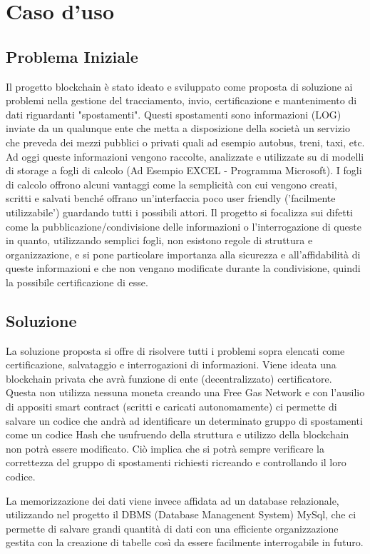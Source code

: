 \documentclass[11pt,a4paper,titlepage]{report}
\begin{document}
\chapter{Caso d'uso}

\section{Problema Iniziale}
Il progetto blockchain è stato ideato e sviluppato come proposta di soluzione ai problemi nella gestione del tracciamento, invio, certificazione e mantenimento di dati riguardanti "spostamenti". Questi spostamenti sono informazioni (LOG) inviate da un qualunque ente che metta a disposizione della società un servizio che preveda dei mezzi pubblici o privati quali ad esempio autobus, treni, taxi, etc. Ad oggi queste informazioni vengono raccolte, analizzate e utilizzate su di modelli di storage a fogli di calcolo (Ad Esempio EXCEL - Programma Microsoft). I fogli di calcolo offrono alcuni vantaggi come la semplicità con cui vengono creati, scritti e salvati benché offrano un'interfaccia poco user friendly ('facilmente utilizzabile') guardando tutti i possibili attori. Il progetto si focalizza sui difetti come la pubblicazione/condivisione delle informazioni o l'interrogazione di queste in quanto, utilizzando semplici fogli, non esistono regole di struttura e organizzazione, e si pone particolare importanza alla sicurezza e all'affidabilità di queste informazioni e che non vengano modificate durante la condivisione, quindi la possibile certificazione di esse.

\section{Soluzione}
La soluzione proposta si offre di risolvere tutti i problemi sopra elencati come certificazione, salvataggio e interrogazioni di informazioni. Viene ideata una blockchain privata che avrà funzione di ente (decentralizzato) certificatore. Questa non utilizza nessuna moneta creando una Free Gas Network e con l'ausilio di appositi smart contract (scritti e caricati autonomamente) ci permette di salvare un codice che andrà ad identificare un determinato gruppo di spostamenti come un codice Hash che usufruendo della struttura e utilizzo della blockchain non potrà essere modificato. Ciò implica che si potrà sempre verificare la correttezza del gruppo di spostamenti richiesti ricreando e controllando il loro codice.

La memorizzazione dei dati viene invece affidata ad un database relazionale, utilizzando nel progetto il DBMS (Database Managenent System) MySql, che ci permette di salvare grandi quantità di dati con una efficiente organizzazione gestita con la creazione di tabelle così da essere facilmente interrogabile in futuro.
 
\end{document}

